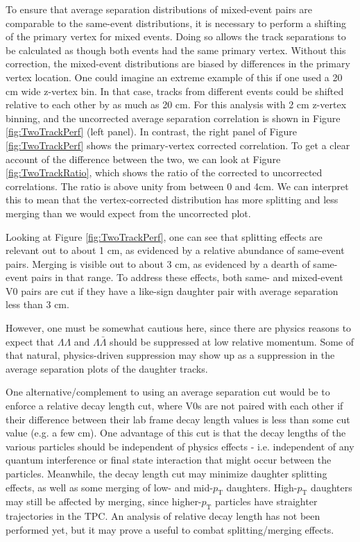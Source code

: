 To ensure that average separation distributions of mixed-event pairs are comparable to the same-event distributions, it is necessary to perform a shifting of the primary vertex for mixed events.  Doing so allows the track separations to be calculated as though both events had the same primary vertex.  Without this correction, the mixed-event distributions are biased by differences in the primary vertex location.  One could imagine an extreme example of this if one used a 20 cm wide z-vertex bin.  In that case, tracks from different events could be shifted relative to each other by as much as 20 cm.  For this analysis with 2 cm z-vertex binning, and the uncorrected average separation correlation is shown in Figure \ref{fig:TwoTrackPerf} (left panel).  In contrast, the right panel of Figure \ref{fig:TwoTrackPerf} shows the primary-vertex corrected correlation.  To get a clear account of the difference between the two, we can look at Figure \ref{fig:TwoTrackRatio}, which shows the ratio of the corrected to uncorrected correlations.  The ratio is above unity from between 0 and 4cm.  We can interpret this to mean that the vertex-corrected distribution has more splitting and less merging than we would expect from the uncorrected plot.

Looking at Figure \ref{fig:TwoTrackPerf}, one can see that splitting effects are relevant out to about 1 cm, as evidenced by a relative abundance of same-event pairs.  Merging is visible out to about 3 cm, as evidenced by a dearth of same-event pairs in that range.  To address these effects, both same- and mixed-event V0 pairs are cut if they have a like-sign daughter pair with average separation less than 3 cm.  

However, one must be somewhat cautious here, since there are physics reasons to expect that $\Lambda\Lambda$ and $\Lambda\bar{\Lambda}$ should be suppressed at low relative momentum.  Some of that natural, physics-driven suppression may show up as a suppression in the average separation plots of the daughter tracks.  

One alternative/complement to using an average separation cut would be to enforce a relative decay length cut, where V0s are not paired with each other if their difference between their lab frame decay length values is less than some cut value (e.g. a few cm).  One advantage of this cut is that the decay lengths of the various particles should be independent of physics effects - i.e. independent of any quantum interference or final state interaction that might occur between the particles.  Meanwhile, the decay length cut may minimize daughter splitting effects, as well as some merging of low- and mid-$p_{\mathrm{T}}$ daughters.  High-$p_{\mathrm{T}}$ daughters may still be affected by merging, since higher-$p_{\mathrm{T}}$ particles have straighter trajectories in the TPC.  An analysis of relative decay length has not been performed yet, but it may prove a useful to combat splitting/merging effects.


